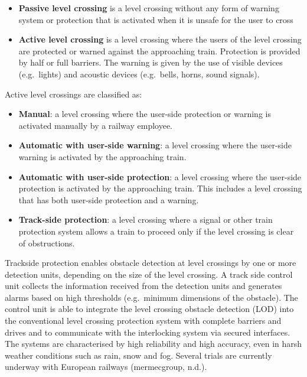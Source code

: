 \documentclass[
]{book}
\providecommand{\tightlist}{%
  \setlength{\itemsep}{0pt}\setlength{\parskip}{0pt}}
\begin{document}
\begin{itemize}
\tightlist
\item
  \textbf{Passive level crossing} is a level crossing without any form of warning system or protection that is activated when it is unsafe for the user to cross
\item
  \textbf{Active level crossing} is a level crossing where the users of the level crossing are protected or warned against the approaching train. Protection is provided by half or full barriers. The warning is given by the use of visible devices (e.g.~lights) and acoustic devices (e.g.~bells, horns, sound signals).
\end{itemize}

Active level crossings are classified as:

\begin{itemize}
\tightlist
\item
  \textbf{Manual}: a level crossing where the user-side protection or warning is activated manually by a railway employee.
\item
  \textbf{Automatic with user-side warning}: a level crossing where the user-side warning is activated by the approaching train.
\item
  \textbf{Automatic with user-side protection}: a level crossing where the user-side protection is activated by the approaching train. This includes a level crossing that has both user-side protection and a warning.
\item
  \textbf{Track-side protection}: a level crossing where a signal or other train protection system allows a train to proceed only if the level crossing is clear of obstructions.
\end{itemize}

Trackside protection enables obstacle detection at level crossings by one or more detection units, depending on the size of the level crossing. A track side control unit collects the information received from the detection units and generates alarms based on high thresholds (e.g.~minimum dimensions of the obstacle). The control unit is able to integrate the level crossing obstacle detection (LOD) into the conventional level crossing protection system with complete barriers and drives and to communicate with the interlocking system via secured interfaces. The systems are characterised by high reliability and high accuracy, even in harsh weather conditions such as rain, snow and fog. Several trials are currently underway with European railways (mermecgroup, n.d.).
\end{document}
